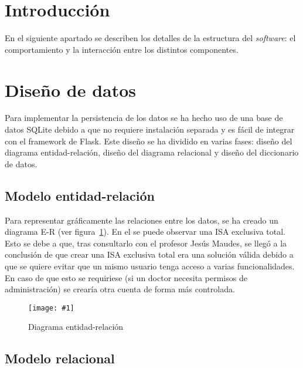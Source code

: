 \newcommand{\imagenAmpliada}[2]{
	\begin{figure}[!h]
		\centering
		\texttt{[image: \#1]}
		\caption{#2}\label{fig:#1}
	\end{figure}
	\FloatBarrier
}
\section{Introducción}
En el siguiente apartado se describen los detalles de la estructura del \textit{software}: el comportamiento y la interacción entre los distintos componentes.

\section{Diseño de datos}
Para implementar la persistencia de los datos se ha hecho uso de una base de datos SQLite debido a que no requiere instalación separada y es fácil de integrar con el framework de Flask. Este diseño se ha dividido en varias fases: diseño del diagrama entidad-relación, diseño del diagrama relacional y diseño del diccionario de datos.

\subsection{Modelo entidad-relación}

Para representar gráficamente las relaciones entre los datos, se ha creado un diagrama E-R (ver figura~\ref{fig:./img/DiagramaER.pdf}). En el se puede observar una ISA exclusiva total. Esto se debe a que, tras consultarlo con el profesor Jesús Maudes, se llegó a la conclusión de que crear una ISA exclusiva total era una solución válida debido a que se quiere evitar que un mismo usuario tenga acceso a varias funcionalidades. En caso de que esto se requiriese (si un doctor necesita permisos de administración) se crearía otra cuenta de forma más controlada.
\begin{landscape}
\imagenAmpliada{./img/DiagramaER.pdf}{Diagrama entidad-relación}
\end{landscape}
\subsection{Modelo relacional}

